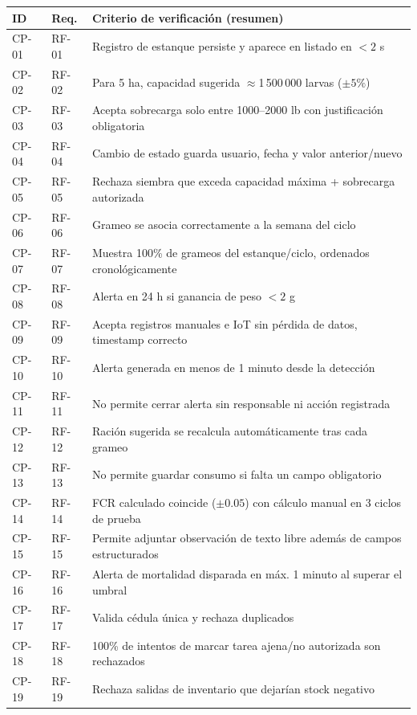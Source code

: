 \documentclass[11pt,a4paper]{article}
\begin{document}
\begin{longtable}{|p{2cm}|p{2cm}|p{10.5cm}|}
\hline
\textbf{ID} & \textbf{Req.} & \textbf{Criterio de verificación (resumen)} \\ \hline
\endhead
CP-01 & RF-01 & Registro de estanque persiste y aparece en listado en $<2$ s \\ \hline
CP-02 & RF-02 & Para 5 ha, capacidad sugerida $\approx$1\,500\,000 larvas ($\pm5\%$) \\ \hline
CP-03 & RF-03 & Acepta sobrecarga solo entre 1000--2000 lb con justificación obligatoria \\ \hline
CP-04 & RF-04 & Cambio de estado guarda usuario, fecha y valor anterior/nuevo \\ \hline
CP-05 & RF-05 & Rechaza siembra que exceda capacidad máxima + sobrecarga autorizada \\ \hline
CP-06 & RF-06 & Grameo se asocia correctamente a la semana del ciclo \\ \hline
CP-07 & RF-07 & Muestra 100\% de grameos del estanque/ciclo, ordenados cronológicamente \\ \hline
CP-08 & RF-08 & Alerta en 24 h si ganancia de peso $<2$ g \\ \hline
CP-09 & RF-09 & Acepta registros manuales e IoT sin pérdida de datos, timestamp correcto \\ \hline
CP-10 & RF-10 & Alerta generada en menos de 1 minuto desde la detección \\ \hline
CP-11 & RF-11 & No permite cerrar alerta sin responsable ni acción registrada \\ \hline
CP-12 & RF-12 & Ración sugerida se recalcula automáticamente tras cada grameo \\ \hline
CP-13 & RF-13 & No permite guardar consumo si falta un campo obligatorio \\ \hline
CP-14 & RF-14 & FCR calculado coincide ($\pm0.05$) con cálculo manual en 3 ciclos de prueba \\ \hline
CP-15 & RF-15 & Permite adjuntar observación de texto libre además de campos estructurados \\ \hline
CP-16 & RF-16 & Alerta de mortalidad disparada en máx. 1 minuto al superar el umbral \\ \hline
CP-17 & RF-17 & Valida cédula única y rechaza duplicados \\ \hline
CP-18 & RF-18 & 100\% de intentos de marcar tarea ajena/no autorizada son rechazados \\ \hline
CP-19 & RF-19 & Rechaza salidas de inventario que dejarían stock negativo \\ \hline

\end{longtable}
\end{document}
